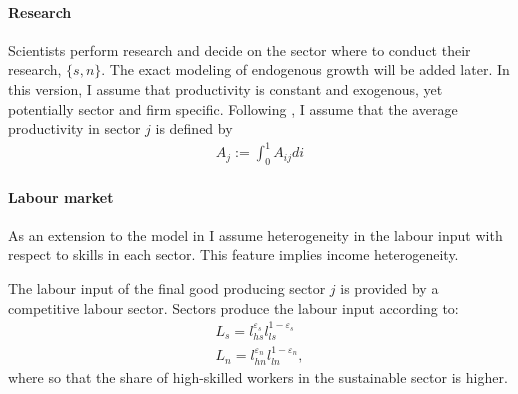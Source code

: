 \paragraph{Research}
Scientists perform research and decide on the sector where to conduct their research, $\{s,n\}$. The exact modeling of endogenous growth will be added later. In this version, I assume that productivity is constant and exogenous, yet potentially sector and firm specific. 
Following \cite{Acemoglu2012TheChange}, I assume that the average productivity in sector $j$ is defined by
\begin{align*}
	A_j:=\int_{0}^{1}A_{ij}di
\end{align*}

\paragraph{Labour market}
As an extension to the model in \cite{Acemoglu2012TheChange} I assume heterogeneity in the labour input with respect to skills in each sector. This feature implies income heterogeneity. 
\begin{comment}
\begin{align*}
H_s= \lambda z_h l_r\\
H_n= (1-\lambda) z_l l_p
\end{align*}
\ar could have that in the initial ss wages in the low sector are higher since less labour is available with $z_l<z_h$. Either allow rich also to work there... or drop $z_h, z_l$. For now, drop $z_h, z_l$ and see what comes out from the simple setup, then think about how to adjust it if need be/ to make it more realistic.

\end{comment}
The labour input of the final good producing sector $j$ is provided by a competitive labour sector. Sectors produce the labour input according to: 
\begin{align*}
L_s= l_{hs}^{\varepsilon_s}l_{ls}^{1-\varepsilon_s}\\
L_n=l_{hn}^{\varepsilon_n}l_{ln}^{1-\varepsilon_n},
\end{align*}
where  so that the share of high-skilled workers in the sustainable sector is higher.


